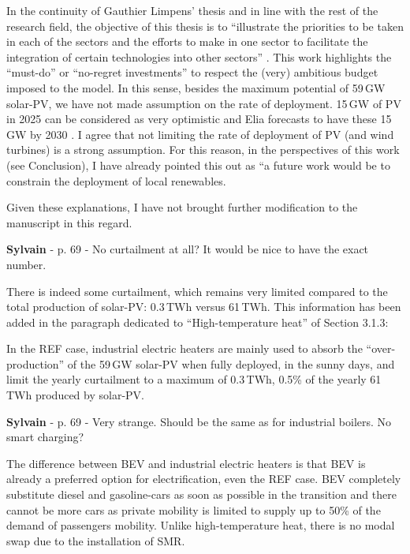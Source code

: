 \documentclass[12pt,a4paper]{article}
\begin{document}
\noindent In the continuity of Gauthier Limpens' thesis  and in line with the rest of the research field, the objective of this thesis is to ``illustrate the priorities to be taken in each of the sectors and the efforts to make in one sector to facilitate the integration of certain technologies into other sectors'' \cite{limpens2021generating}. This work highlights the ``must-do'' or ``no-regret investments'' to respect the (very) ambitious  budget imposed to the model. In this sense, besides the maximum potential of 59\,GW solar-PV, we have not made assumption on the rate of deployment. 15\,GW of PV in 2025 can be considered as very optimistic and Elia forecasts to have these 15\,GW by 2030 \cite{Elia_2024_2034}. I agree that not limiting the rate of deployment of PV (and wind turbines) is a strong assumption. For this reason, in the perspectives of this work (see Conclusion), I have already pointed this out as ``a future work would be to constrain the deployment of local renewables.

Given these explanations, I have not brought further modification to the manuscript in this regard.

\begin{mdframed}[style=comment] %
{\color{purple} \textbf{Sylvain}} - p. 69 - No curtailment at all? It would be nice to have the exact number.
\end{mdframed}

\noindent There is indeed some curtailment, which remains very limited compared to the total production of solar-PV: 0.3\,TWh versus 61\,TWh. This information has been added {\color{blue}in the paragraph dedicated to ``High-temperature heat'' of Section 3.1.3}: 

\begin{mdframed}[style=manuscript] %
In the REF case, industrial electric heaters are mainly used to absorb the ``over-production'' of the 59\,GW solar-PV when fully deployed, in the sunny days, and limit the yearly curtailment to a maximum of 0.3\,TWh, 0.5\% of the yearly 61\,TWh produced by solar-PV.
\end{mdframed}

\begin{mdframed}[style=comment] %
{\color{purple} \textbf{Sylvain}} - p. 69 - Very strange. Should be the same as for industrial boilers. No smart charging?
\end{mdframed}

\noindent The difference between BEV and industrial electric heaters is that BEV is already a preferred option for electrification, even the REF case. BEV completely substitute diesel and gasoline-cars as soon as possible in the transition and there cannot be more cars as private mobility is limited to supply up to 50\% of the demand of passengers mobility. Unlike high-temperature heat, there is no modal swap due to the installation of SMR.
\end{document}
